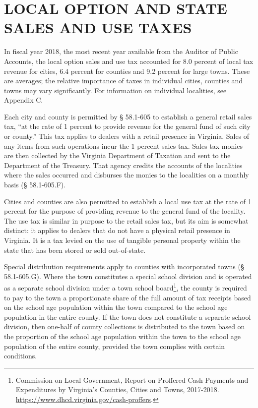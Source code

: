 \documentclass[
]{book}
\begin{document}
\hypertarget{local-option-and-state-sales-and-use-taxes}{%
\section{LOCAL OPTION AND STATE SALES AND USE TAXES}\label{local-option-and-state-sales-and-use-taxes}}

In fiscal year 2018, the most recent year available from the Auditor of Public Accounts, the local option sales and use tax accounted for 8.0 percent of local tax revenue for cities, 6.4 percent for counties and 9.2 percent for large towns. These are averages; the relative importance of taxes in individual cities, counties and towns may vary significantly. For information on individual localities, see Appendix C.

Each city and county is permitted by § 58.1-605 to establish a general retail sales tax, ``at the rate of 1 percent to provide revenue for the general fund of such city or county.'' This tax applies to dealers with a retail presence in Virginia. Sales of any items from such operations incur the 1 percent sales tax. Sales tax monies are then collected by the Virginia Department of Taxation and sent to the Department of the Treasury. That agency credits the accounts of the localities where the sales occurred and disburses the monies to the localities on a monthly basis (§ 58.1-605.F).

Cities and counties are also permitted to establish a local use tax at the rate of 1 percent for the purpose of providing revenue to the general fund of the locality. The use tax is similar in purpose to the retail sales tax, but its aim is somewhat distinct: it applies to dealers that do not have a physical retail presence in Virginia. It is a tax levied on the use of tangible personal property within the state that has been stored or sold out-of-state.

Special distribution requirements apply to counties with incorporated towns (§ 58.1-605.G). Where the town constitutes a special school division and is operated as a separate school division under a town school board\footnote{Commission on Local Government, Report on Proffered Cash Payments and Expenditures by Virginia's Counties, Cities and Towns, 2017-2018. \url{https://www.dhcd.virginia.gov/cash-proffers}.}, the county is required to pay to the town a proportionate share of the full amount of tax receipts based on the school age population within the town compared to the school age population in the entire county. If the town does not constitute a separate school division, then one-half of county collections is distributed to the town based on the proportion of the school age population within the town to the school age population of the entire county, provided the town complies with certain conditions.
\end{document}
